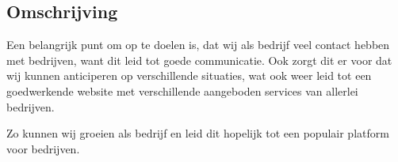 \subsection{Omschrijving}
Een belangrijk punt om op te doelen is,
dat wij als bedrijf veel contact hebben met bedrijven,
want dit leid tot goede communicatie. 
Ook zorgt dit er voor dat wij kunnen anticiperen op verschillende situaties,
wat ook weer leid tot een goedwerkende website met verschillende aangeboden services van allerlei bedrijven.

Zo kunnen wij groeien als bedrijf en
leid dit hopelijk tot een populair platform voor bedrijven.

\iffalse
*is de communicatie met veel bedrijven. ook hierdoor wordt onze naam bekend waardoor*
bespreken over hoe en wat de situaties zijn en wat hun belangen zi
\fi
